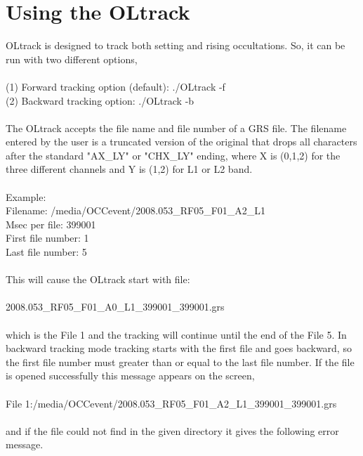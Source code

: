 \documentclass[12pt,letterpaper,oneside]{report}
\begin{document}
\section{Using the OLtrack}
{\indent\indent}  OLtrack is designed to track both setting and rising occultations. So, it can be run with two different options,\\\\
(1) Forward tracking option (default): {\indent} {\selectfont ./OLtrack -f}\\
(2) Backward tracking option: {\indent\indent\indent} {\selectfont ./OLtrack -b}\\\\
The OLtrack accepts the file name and file number of a GRS file. The filename entered by the user is a truncated version of the original that drops all characters after the standard "AX\_LY" or "CHX\_LY" ending, where X is (0,1,2) for the three different channels and Y is (1,2) for L1 or L2 band.\\\\
Example:\\
{\indent\indent} {\selectfont Filename: /media/OCCevent/2008.053\_RF05\_F01\_A2\_L1}\\
{\indent\indent} {\selectfont Msec per file: 399001}\\
{\indent\indent} {\selectfont First file number: 1}\\
{\indent\indent} {\selectfont Last file number: 5}\\\\
This will cause the OLtrack start with file:\\\\
{\indent\indent} 2008.053\_RF05\_F01\_A0\_L1\_399001\_399001.grs\\\\
which is the File 1 and the tracking will continue until the end of the File 5. In backward tracking mode tracking starts with the first file and goes backward, so the first file number must greater than or equal to the last file number. If the file is opened successfully this message appears on the screen,\\\\
{\selectfont File 1:/media/OCCevent/2008.053\_RF05\_F01\_A2\_L1\_399001\_399001.grs}\\\\
and if the file could not find in the given directory it gives the following error message.\\\\
\end{document}
